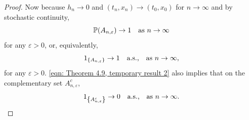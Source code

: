 \begin{proof}
    Now because $h_n \rightarrow 0$ and $(t_n,x_n) \rightarrow (t_0,x_0)$ for $n \rightarrow \infty$ and by stochastic continuity,
    \begin{equation*}
        \mathbb{P}(A_{n,\varepsilon}) \rightarrow 1 \quad \text{as } n \rightarrow \infty
    \end{equation*}
    for any $\varepsilon >0$, or, equivalently,
    \begin{equation}
        1_{\left\{A_{n,\varepsilon}\right\}} \rightarrow 1 \quad \text{a.s.,} \quad \text{as } n \rightarrow \infty,
        \label{eqn: Theorem 4.9, temporary result 2}
    \end{equation}
    for any $\varepsilon >0$. \eqref{eqn: Theorem 4.9, temporary result 2} also implies that on the complementary set $A_{n,\varepsilon}^c$, 
    \begin{equation}
        1_{\left\{A_{n,\varepsilon}^c\right\}} \rightarrow 0 \quad \text{a.s.,} \quad \text{as } n \rightarrow \infty.
        \label{eqn: Theorem 4.9, temporary result 3}
    \end{equation}
    

\end{proof}
